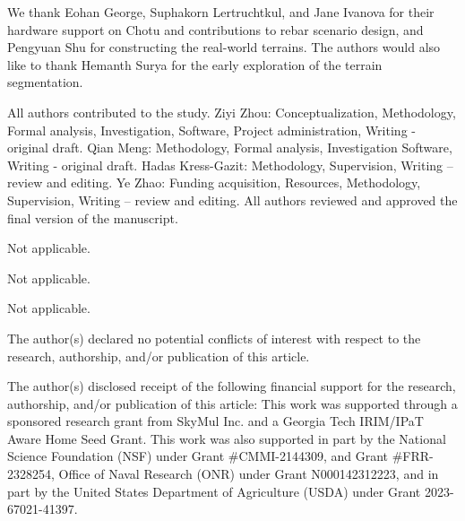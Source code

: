 \documentclass[Afour,sageh,times]{sagej}
\begin{document}




\begin{acks}
We thank Eohan George, Suphakorn Lertruchtkul, and Jane Ivanova for their hardware support on Chotu and contributions to rebar scenario design, and Pengyuan Shu for constructing the real-world terrains. The authors would also like to thank Hemanth Surya for the early exploration of the terrain segmentation.
\end{acks}

\begin{aucon}
All authors contributed to the study. Ziyi Zhou: Conceptualization,
Methodology, Formal analysis, Investigation, Software, Project
administration, Writing - original draft. Qian Meng: Methodology, Formal analysis, Investigation Software, Writing - original draft. Hadas Kress-Gazit: Methodology, Supervision, Writing – review and editing. Ye Zhao: Funding acquisition, Resources, Methodology, Supervision, Writing – review and editing. All authors reviewed and approved the final version
of the manuscript.
\end{aucon}

\begin{ethical}
Not applicable.
\end{ethical}

\begin{conpart}
Not applicable.
\end{conpart}

\begin{conpub}
Not applicable.
\end{conpub}

\begin{dci}
The author(s) declared no potential conflicts of interest with respect
to the research, authorship, and/or publication of this article.
\end{dci}

\begin{funding}
The author(s) disclosed receipt of the following financial support
for the research, authorship, and/or publication of this article:
This work was supported
through a sponsored research grant from SkyMul Inc. and a Georgia Tech
IRIM/IPaT Aware Home Seed Grant.
This work was also supported in part by the National
Science Foundation (NSF) under Grant \#CMMI-2144309, and Grant \#FRR-2328254, Office of Naval Research (ONR)
under Grant N000142312223, and in part by the United States Department of Agriculture (USDA) under Grant 2023-67021-41397.
\end{funding}



\end{document}
